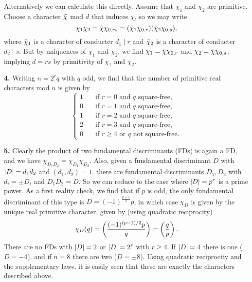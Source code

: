 \documentclass[a4paper,11pt]{article}
\begin{document}
Alternatively we can calculate this directly. Assume that $\chi_1$ and $\chi_2$
are primitive. Choose a character $\Tilde \chi$ mod $d$ that induces $\chi$, so
we may write $$\chi_1\chi_2 = \Tilde \chi \chi_{0,rs} = (\Tilde \chi_1
\chi_{0,r}) (\Tilde \chi_2 \chi_{0,s}),$$ where $\Tilde \chi_1$ is a character
of conducter $d_1 \mid r$ and $\Tilde \chi_2$ is a character of conducter $d_2
\mid s$. But by uniqueness of $\chi_1$ and $\chi_2$, we find $\chi_1 = \Tilde
\chi \chi_{0,r}$ and $\chi_2 = \Tilde \chi \chi_{0,s}$, implying $d = rs$ by
primitivity of $\chi_1$ and $\chi_2$. 

\textbf{4.} Writing $n = 2^r q$ with $q$ odd, we find that the number of primitive real
characters mod $n$ is given by 
\[
    \begin{cases}
        1 \quad &\text{if $r = 0$ and $q$ square-free}, \\
        0 \quad &\text{if $r = 1$ and $q$ square-free}, \\
        1 \quad &\text{if $r = 2$ and $q$ square-free}, \\
        2 \quad &\text{if $r = 3$ and $q$ square-free}, \\
        0 \quad &\text{if $r \geq 4$ or $q$ not square-free}. 
    \end{cases}
\]

\textbf{5.} Clearly the product of two fundamental discriminants (FDs) is again a FD,
and we have $\chi_{D_1 D_2} = \chi_{D_1}\chi_{D_2}$. Also, given a fundamental
discriminant $D$ with $\left\lvert D \right\rvert = d_1 d_2$ and $(d_1, d_2) = 1$, there are
fundamental discriminants $D_1, D_2$ with $d_i = \pm D_i$ and $D_1 D_2 = D$. 
So we can reduce to the case where
$\left\lvert D \right\rvert = p^r$ is a prime power. As a first reality check, we find that if $p$
is odd,
the only fundamental discriminant of this type is $D = (-1)^{\frac{p-1}2} p$,
in which case $\chi_D$ is given by the unique real primitive character, given by (using quadratic reciprocity)
$$\chi_D(q) = \left( \frac{(-1)^{(p-1)/2}p}{q} \right) = \left( \frac{q}{p} \right).$$
There are no FDs with $\left\lvert D \right\rvert =2$ or $\left\lvert D \right\rvert = 2^r$ with $r \geq 4$. If $\left\lvert D \right\rvert = 4$
there is one ($D = -4$), and if $n = 8$ there are two ($D = \pm 8$).
Using quadratic reciprocity and the supplementary laws, it is easily seen that these
are exactly the characters described above.
\end{document}

